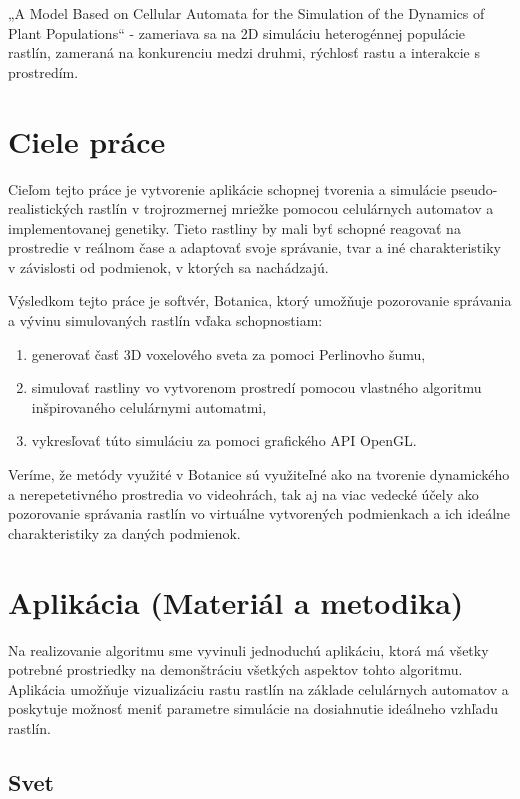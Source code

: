 \documentclass[12pt]{article}
\begin{document}
„A Model Based on Cellular Automata for the Simulation of the Dynamics of
Plant Populations“ - zameriava sa na 2D simuláciu heterogénnej populácie
rastlín, zameraná na konkurenciu medzi druhmi, rýchlosť rastu a interakcie
s prostredím.

\section{Ciele práce}

Cieľom tejto práce je vytvorenie aplikácie schopnej tvorenia a simulácie
pseudo-rea\-listických rastlín v trojrozmernej mriežke pomocou celulárnych
automatov a implementovanej genetiky.
Tieto rastliny by mali byť schopné reagovať na prostredie v reálnom čase
a adaptovať svoje správanie, tvar a iné charakteristiky v závislosti
od podmienok, v ktorých sa nachádzajú.

Výsledkom tejto práce je softvér, Botanica, ktorý umožňuje pozorovanie
správania a vývinu simulovaných rastlín vďaka schopnostiam:

\begin{enumerate}
	\item generovať časť 3D voxelového sveta za pomoci Perlinovho šumu,
	\item simulovať rastliny vo vytvorenom prostredí pomocou vlastného
	      algoritmu inšpirovaného celulárnymi automatmi,
	\item vykresľovať túto simuláciu za pomoci grafického API OpenGL.
\end{enumerate}

Veríme, že metódy využité v Botanice sú využiteľné ako na tvorenie dynamického
a nerepetetivného prostredia vo videohrách, tak aj na viac vedecké účely
ako pozorovanie správania rastlín vo virtuálne vytvorených podmienkach
a ich ideálne charakteristiky za daných podmienok.


\section{Aplikácia (Materiál a metodika)}

Na realizovanie algoritmu sme vyvinuli jednoduchú aplikáciu, ktorá má
všetky potrebné prostriedky na demonštráciu všetkých aspektov tohto algoritmu.
Aplikácia umožňuje vizualizáciu rastu rastlín na základe celulárnych automatov
a poskytuje možnosť meniť parametre simulácie na dosiahnutie ideálneho vzhľadu
rastlín.

\subsection{Svet} \label{subsec:svet}
\end{document}
